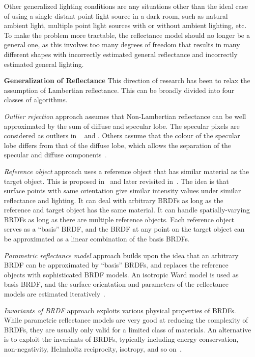 Other generalized lighting conditions are any situations other than the ideal case of using a single distant point light source in a dark room, such as natural ambient light, multiple point light sources with or without ambient lighting, etc. To make the problem more tractable, the reflectance model should no longer be a general one, as this involves too many degrees of freedom that results in many different shapes with incorrectly estimated general reflectance and incorrectly estimated general lighting.

\textbf{Generalization of Reflectance} This direction of research has been to relax the assumption of Lambertian reflectance. This can be broadly divided into four classes of algorithms.

\textit{Outlier rejection} approach assumes that Non-Lambertian reflectance can be well approximated by the sum of diffuse and specular lobe. The specular pixels are considered as outliers in ~\cite{coleman1982obtaining} and \cite{barsky20034}. Others assume that the colour of the specular lobe differs from that of the diffuse lobe, which allows the separation of the specular and diffuse components~\cite{mallick2005beyond,sato1994temporal,schluns1993photometric}.

\textit{Reference object} approach uses a reference object that has similar material as the target object. This is proposed in~\cite{silver1980determining} and later revisited in~\cite{hertzmann2005example}. The idea is that surface points with same orientation give similar intensity values under similar reflectance and lighting. It can deal with arbitrary BRDFs as long as the reference and target object has the same material. It can handle spatially-varying BRDFs as long as there are multiple reference objects. Each reference object serves as a ``basis'' BRDF, and the BRDF at any point on the target object can be approximated as a linear combination of the basis BRDFs.

\textit{Parametric reflectance model} approach builds upon the idea that an arbitrary BRDF can be approximated by ``basis'' BRDFs, and replaces the reference objects with sophisticated BRDF models. An isotropic Ward model is used as basis BRDF, and the surface orientation and parameters of the reflectance models are estimated iteratively~\cite{goldman2010shape}.

\textit{Invariants of BRDF} approach exploits various physical properties of BRDFs. While parametric reflectance models are very good at reducing the complexity of BRDFs, they are usually only valid for a limited class of materials. An alternative is to exploit the invariants of BRDFs, typically including energy conservation, non-negativity, Helmholtz reciprocity, isotropy, and so on~\cite{zickler2002helmholtz,alldrin2007toward}.

